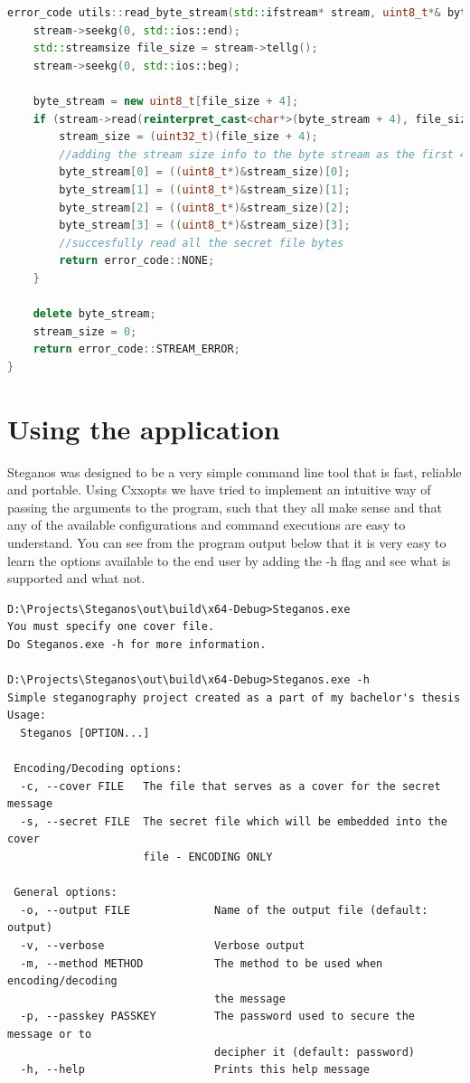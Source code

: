 \begin{lstlisting}[language=C++, caption=The TRY macro used for any critical operation,label={lst:read_file_code_ex}]
error_code utils::read_byte_stream(std::ifstream* stream, uint8_t*& byte_stream, uint32_t& stream_size) {
	stream->seekg(0, std::ios::end);
	std::streamsize file_size = stream->tellg();
	stream->seekg(0, std::ios::beg);

	byte_stream = new uint8_t[file_size + 4];
	if (stream->read(reinterpret_cast<char*>(byte_stream + 4), file_size)) {
		stream_size = (uint32_t)(file_size + 4);
		//adding the stream size info to the byte stream as the first 4 bytes
		byte_stream[0] = ((uint8_t*)&stream_size)[0];
		byte_stream[1] = ((uint8_t*)&stream_size)[1];
		byte_stream[2] = ((uint8_t*)&stream_size)[2];
		byte_stream[3] = ((uint8_t*)&stream_size)[3];
		//succesfully read all the secret file bytes
		return error_code::NONE;
	}

	delete byte_stream;
	stream_size = 0;
	return error_code::STREAM_ERROR;
}
\end{lstlisting}



\section{Using the application}
Steganos was designed to be a very simple command line tool that is fast, reliable and portable. Using Cxxopts we have tried to implement an intuitive way of passing the arguments to the program, such that they all make sense and that any of the available configurations and command executions are easy to understand. You can see from the program output below that it is very easy to learn the options available to the end user by adding the -h flag and see what is supported and what not.
\begin{verbatim}
D:\Projects\Steganos\out\build\x64-Debug>Steganos.exe
You must specify one cover file.
Do Steganos.exe -h for more information.

D:\Projects\Steganos\out\build\x64-Debug>Steganos.exe -h
Simple steganography project created as a part of my bachelor's thesis
Usage:
  Steganos [OPTION...]

 Encoding/Decoding options:
  -c, --cover FILE   The file that serves as a cover for the secret message
  -s, --secret FILE  The secret file which will be embedded into the cover
                     file - ENCODING ONLY

 General options:
  -o, --output FILE             Name of the output file (default: output)
  -v, --verbose                 Verbose output
  -m, --method METHOD           The method to be used when encoding/decoding
                                the message
  -p, --passkey PASSKEY         The password used to secure the message or to
                                decipher it (default: password)
  -h, --help                    Prints this help message
\end{verbatim}

